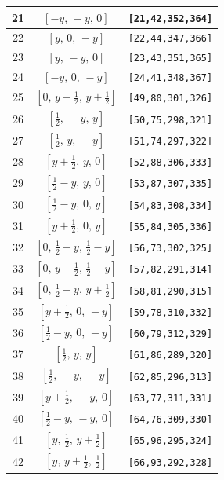 \documentclass[fleqn,8pt]{jsarticle}
\begin{document}
\begin{longtable}{ccc}
21 & $\left[ - y,\, - y,\, 0 \right]$ & {\tt [21,42,352,364]} \\ \hline
22 & $\left[ y,\, 0,\, - y \right]$ & {\tt [22,44,347,366]} \\ \hline
23 & $\left[ y,\, - y,\, 0 \right]$ & {\tt [23,43,351,365]} \\ \hline
24 & $\left[ - y,\, 0,\, - y \right]$ & {\tt [24,41,348,367]} \\ \hline
25 & $\left[ 0,\, y + \frac{1}{2},\, y + \frac{1}{2} \right]$ & {\tt [49,80,301,326]} \\ \hline
26 & $\left[ \frac{1}{2},\, - y,\, y \right]$ & {\tt [50,75,298,321]} \\ \hline
27 & $\left[ \frac{1}{2},\, y,\, - y \right]$ & {\tt [51,74,297,322]} \\ \hline
28 & $\left[ y + \frac{1}{2},\, y,\, 0 \right]$ & {\tt [52,88,306,333]} \\ \hline
29 & $\left[ \frac{1}{2} - y,\, y,\, 0 \right]$ & {\tt [53,87,307,335]} \\ \hline
30 & $\left[ \frac{1}{2} - y,\, 0,\, y \right]$ & {\tt [54,83,308,334]} \\ \hline
31 & $\left[ y + \frac{1}{2},\, 0,\, y \right]$ & {\tt [55,84,305,336]} \\ \hline
32 & $\left[ 0,\, \frac{1}{2} - y,\, \frac{1}{2} - y \right]$ & {\tt [56,73,302,325]} \\ \hline
33 & $\left[ 0,\, y + \frac{1}{2},\, \frac{1}{2} - y \right]$ & {\tt [57,82,291,314]} \\ \hline
34 & $\left[ 0,\, \frac{1}{2} - y,\, y + \frac{1}{2} \right]$ & {\tt [58,81,290,315]} \\ \hline
35 & $\left[ y + \frac{1}{2},\, 0,\, - y \right]$ & {\tt [59,78,310,332]} \\ \hline
36 & $\left[ \frac{1}{2} - y,\, 0,\, - y \right]$ & {\tt [60,79,312,329]} \\ \hline
37 & $\left[ \frac{1}{2},\, y,\, y \right]$ & {\tt [61,86,289,320]} \\ \hline
38 & $\left[ \frac{1}{2},\, - y,\, - y \right]$ & {\tt [62,85,296,313]} \\ \hline
39 & $\left[ y + \frac{1}{2},\, - y,\, 0 \right]$ & {\tt [63,77,311,331]} \\ \hline
40 & $\left[ \frac{1}{2} - y,\, - y,\, 0 \right]$ & {\tt [64,76,309,330]} \\ \hline
41 & $\left[ y,\, \frac{1}{2},\, y + \frac{1}{2} \right]$ & {\tt [65,96,295,324]} \\ \hline
42 & $\left[ y,\, y + \frac{1}{2},\, \frac{1}{2} \right]$ & {\tt [66,93,292,328]} \\ \hline

\end{longtable}
\end{document}
